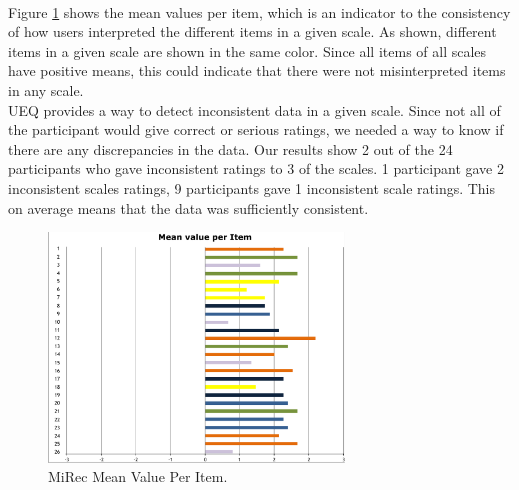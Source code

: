 \\
Figure \ref{fig:figure56} shows the mean values per item, which is an indicator
to the consistency of how users interpreted the different items in a given
scale. As shown, different items in a given scale are shown in the same color.
Since all items of all scales have positive means, this could indicate that
there were not misinterpreted items in any scale.\\

UEQ provides a way to detect inconsistent data in a given scale. Since not all
of the participant would give correct or serious ratings, we needed a way to
know if there are any discrepancies in the data. Our results show 2 out of
the 24 participants who gave inconsistent ratings to 3 of the scales. 1
participant gave 2 inconsistent scales ratings, 9 participants gave 1
inconsistent scale ratings. This on average means that the data was sufficiently
consistent.
\begin{figure}[!htbp]
\centering
\includegraphics[width=0.7\textwidth]{figures/mirec-results3}
\caption{MiRec Mean Value Per Item.}
\label{fig:figure56}
\end{figure}
